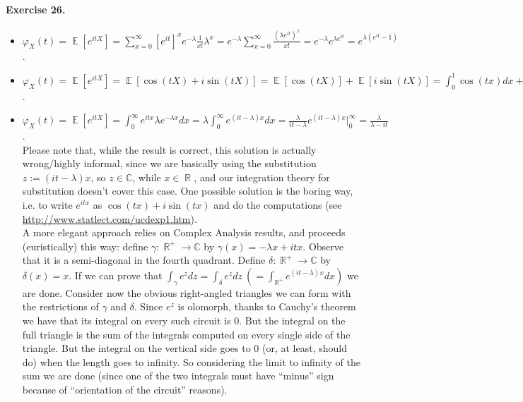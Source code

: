 \documentclass[12pt,a4paper]{report}
\theoremstyle{definition}
\theoremstyle{num.custom-title}
\DeclareMathOperator{\R}{\mathbb{R}}
\DeclareMathOperator{\E}{\mathbb{E}}
\renewcommand{\phi}{\varphi}
\renewcommand{\1}{\mathbbm{1}}
\begin{document}
\paragraph{Exercise 26.}
\begin{itemize}
\item[(a)] $\phi_X(t)=\E[e^{itX}]=\sum_{x=0}^\infty [e^{it}]^x e^{-\lambda}\frac1{x!}\lambda^x=e^{-\lambda}\sum_{x=0}^{\infty}\frac{(\lambda e^{it})^x}{x!}=e^{-\lambda}e^{\lambda e^{it}}=e^{\lambda (e^{it}-1)}$.
\item[(b)] $\phi_X(t)=\E[e^{itX}]=\E[\cos(tX)+i\sin(tX)]=\E[\cos(tX)]+\E[i\sin(tX)]= \int_{0}^{1} \cos(tx) dx + i\int_{0}^{1} \sin(tx) dx = \frac{1}{t} (\sin(t)-\sin(0)) - \frac{i}{t} (\cos(t)-\cos(0))= \frac{\sin(t)}{t}-i \frac{\cos(t)-1}{t}$.
\item[(c)] $\phi_X(t)=\E[e^{itX}]= \int_0^{\infty} e^{itx}  \lambda e^{-\lambda x } dx = \lambda \int_0^{\infty} e^{(it-\lambda)x} dx = \frac{\lambda}{it - \lambda} e^{(it - \lambda)x}\bigg|_0^{\infty} = \frac{\lambda}{ \lambda- it}$. \\
Please note that, while the result is correct, this solution is actually wrong/highly informal, since we are basically using the substitution $z:=(it-\lambda)x$, so $z \in \mathbb C$, while $x \in \R$, and our integration theory for substitution doesn't cover this case. One possible solution is the boring way, i.e. to write $e^{itx}$ as $\cos(tx)+i\sin(tx)$ and do the computations (see \url{http://www.statlect.com/ucdexp1.htm}). \\
A more elegant approach relies on Complex Analysis results, and proceeds (euristically) this way: define $\gamma: \R^+ \to \mathbb C$ by $\gamma(x)=-\lambda x + it x$. Observe that it is a semi-diagonal in the fourth quadrant. Define $\delta: \R^+ \to \mathbb C$ by $\delta(x)=x$. If we can prove that $\int_\gamma e^z dz = \int_\delta e^z dz \ (=\int_{\R^+} e^{(it-\lambda)x} dx)$ we are done. Consider now the obvious right-angled triangles we can form with the restrictions of $\gamma$ and $\delta$. Since $e^z$ is olomorph, thanks to Cauchy's theorem we have that its integral on every such circuit is $0$. But the integral on the full triangle is the sum of the integrals computed on every single side of the triangle. But the integral on the vertical side goes to $0$ (or, at least, should do) when the length goes to infinity. So considering the limit to infinity of the sum we are done (since one of the two integrals must have ``minus'' sign because of ``orientation of the circuit'' reasons).
\end{itemize}
\end{document}
